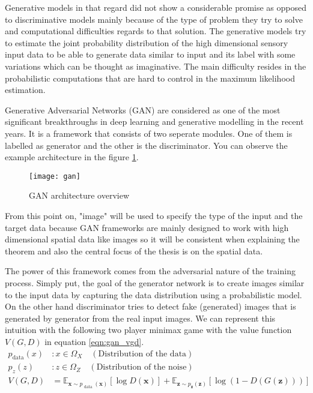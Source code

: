 Generative models in that regard did not show a considerable promise as opposed to discriminative
models mainly because of the type of problem they try to solve and computational difficulties
regards to that solution. The generative models try to estimate the joint probability distribution
of the high dimensional sensory input data to be able to generate data similar to input and its
label with some variations which can be thought as imaginative. The main difficulty resides in
the probabilistic computations that are hard to control in the maximum likelihood estimation.
\cite{Goodfellow:2014:GAN:2969033.2969125} \cite{pmlr-v5-salakhutdinov09a}

Generative Adversarial Networks (GAN) are considered as one of the most significant breakthroughs in
deep learning and generative modelling in the recent years. It is a framework that consists of two
seperate modules. One of them is labelled as generator and the other is the discriminator. You can
observe the example architecture in the figure \ref{fig:gan_network}. 

\begin{figure}[h!]
	\centering
	\texttt{[image: gan]}
    \caption{GAN architecture overview}
    \label{fig:gan_network}
\end{figure}

From this point on, "image" will be used to specify the type of the input and the target data because
GAN frameworks are mainly designed to work with high dimensional spatial data like images so it will
be consistent when explaining the theorem and also the central focus of the thesis is on the spatial
data. 

The power of this framework comes from the adversarial nature of the training process. Simply put,
the goal of the generator network is to create images similar to the input data by capturing the
data distribution using a probabilistic model. On the other hand discriminator tries to detect fake
(generated) images that is generated by generator from the real input images. We can represent this
intuition with the following two player minimax game with the value function $V(G,D)$ in equation \ref{eqn:gan_vgd}.
\cite{Goodfellow:2014:GAN:2969033.2969125}
\begin{align}
    p_{\text{data}} (x) & : x \in \Omega_{X} \quad (\text{Distribution of the data})\\[5pt]
    p_z (z) & : z \in \Omega_{Z} \quad (\text{Distribution of the noise}) \\[5pt]
    \label{eqn:gan_vgd}
    V(G, D) &= \mathbb{E}_{\boldsymbol{x} \sim p_{\text { data }}(\boldsymbol{x})}[\log D(\boldsymbol{x})]+\mathbb{E}_{\boldsymbol{z} \sim p_{\boldsymbol{z}}(\boldsymbol{z})}[\log (1-D(G(\boldsymbol{z})))]
\end{align}

